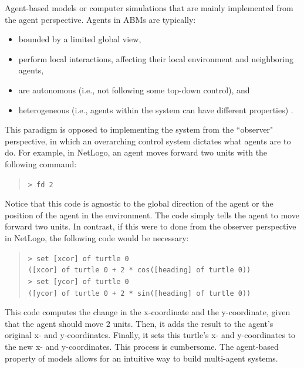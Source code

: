 Agent-based models or computer simulations that are mainly implemented from the agent perspective.
Agents in ABMs are typically:
\begin{itemize}
   \item bounded by a limited global view,
   \item perform local interactions, affecting their local environment and neighboring agents,
   \item are autonomous (i.e., not following some top-down control), and
   \item heterogeneous (i.e., agents within the system can have different properties) \cite{epstein1999agent}.
\end{itemize}
This paradigm is opposed to implementing the system from the ``observer" perspective, in which an overarching control system dictates what agents are to do.
For example, in NetLogo, an agent moves forward two units with the following command:
\begin{quote}
\texttt{\small > fd 2}
\end{quote}
Notice that this code is agnostic to the global direction of the agent or the position of the agent in the environment.
The code simply tells the agent to move forward two units.
In contrast, if this were to done from the observer perspective in NetLogo, the following code would be necessary:
\begin{quote}
\texttt{\small > set [xcor] of turtle 0\\
([xcor] of turtle 0 + 2 * cos([heading] of turtle 0))\\
> set [ycor] of turtle 0\\
([ycor] of turtle 0 + 2 * sin([heading] of turtle 0))}
\end{quote}
This code computes the change in the x-coordinate and the y-coordinate, given that the agent should move 2 units.
Then, it adds the result to the agent's original x- and y-coordinates.
Finally, it sets this turtle's x- and y-coordinates to the new x- and y-coordinates.
This process is cumbersome.
The agent-based property of models allows for an intuitive way to build multi-agent systems.


